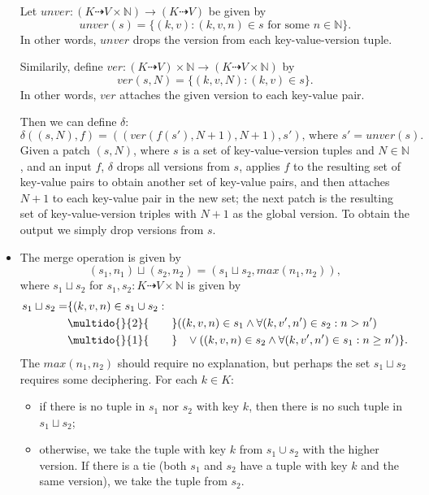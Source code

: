 \documentclass[12pt,a4paper,en]{pracamgr}
\newcommand{\mbb}[1]{\mathbb{#1}}
\newcommand{\ind}[1]{\multido{}{#1}{\qquad}}
\begin{document}
\begin{ex}
\begin{itemize}
            Let $unver: (K \dashrightarrow V \times \mbb N) \rightarrow (K \dashrightarrow V)$ be given by
            $$unver(s) = \{(k, v): (k, v, n) \in s\text{ for some } n \in \mbb N\}.$$
			In other words, $unver$ drops the version from each key-value-version tuple.

            Similarily, define $ver: (K \dashrightarrow V) \times \mbb N \rightarrow (K \dashrightarrow V \times \mbb N)$ by
			$$ver(s, N) = \{(k, v, N): (k, v) \in s\}.$$
			In other words, $ver$ attaches the given version to each key-value pair.

			Then we can define $\delta$:
            $$ \delta((s, N), f) = ((ver(f(s'), N + 1), N + 1), s')\text{, where } s' = unver(s). $$
            Given a patch $(s, N)$, where $s$ is a set of key-value-version tuples and $N \in \mbb N$, and an input $f$, $\delta$ drops all versions from $s$, applies $f$ to the resulting set of key-value pairs to obtain another set of key-value pairs, and then attaches $N + 1$ to each key-value pair in the new set; the next patch is the resulting set of key-value-version triples with $N+1$ as the global version. To obtain the output we simply drop versions from $s$.
		\item The merge operation is given by
                $$ (s_1, n_1) \sqcup (s_2, n_2) = (s_1 \sqcup s_2, max(n_1, n_2)), $$
                where $s_1 \sqcup s_2$ for $s_1, s_2: K \dashrightarrow V \times \mbb N$ is given by
			\begin{equation*}
			\begin{split}
                s_1 \sqcup s_2 =
                    & \{(k, v, n) \in s_1 \cup s_2:\\
                    &\ind{2} ((k, v, n) \in s_1 \land \forall (k, v', n') \in s_2: n > n') \\
                    &\ind{1}\, \ \ \lor ((k, v, n) \in s_2 \land \forall (k, v', n') \in s_1: n \ge n')\}.
			\end{split}
			\end{equation*}
            The $max(n_1, n_2)$ should require no explanation, but perhaps the set $s_1 \sqcup s_2$ requires some deciphering. For each $k \in K$:
			\begin{itemize}
				\item if there is no tuple in $s_1$ nor $s_2$ with key $k$, then there is no such tuple in $s_1 \sqcup s_2$;
				\item otherwise, we take the tuple with key $k$ from $s_1 \cup s_2$ with the higher version. If there is a tie (both $s_1$ and $s_2$ have a tuple with key $k$ and the same version), we take the tuple from $s_2$.
			\end{itemize}


\end{itemize}
\end{ex}
\end{document}
